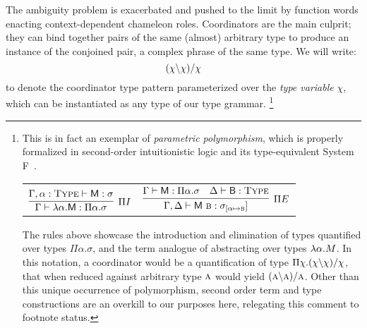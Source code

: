 The ambiguity problem is exacerbated and pushed to the limit by function words enacting context-dependent chameleon roles.
Coordinators are the main culprit; they can bind together pairs of the same (almost) arbitrary type to produce an instance of the conjoined pair, a complex phrase of the same type.
We will write:
\begin{equation}\label{equation:polymorphic_nl_crd}
(\chi\backslash\chi)/\chi
\end{equation}
to denote the coordinator type pattern parameterized over the \textit{type variable} $\chi$, which can be instantiated as any type of our type grammar.%
\footnote{
This is in fact an exemplar of \textit{parametric polymorphism}, which is properly formalized in second-order intuitionistic logic and its type-equivalent System F~\cite{girard1972interpretation, reynolds1974towards}. 
\begin{center}
\begin{tabularx}{0.6\textwidth}{@{}cc@{}}
$\infer[\Pi I]{\Gamma \vdash \lam \alpha.\term{M}: \Pi \alpha.\sigma}{\Gamma, \alpha : \type \vdash \term{M}: \sigma}$
&
$\infer[\Pi E]{\Gamma, \Delta \vdash \term{M~\prop{b}}: \sigma_{[\alpha\mapsto\smallprop{b}}]}{\Gamma \vdash\term{M}: \Pi \alpha.\sigma &  \Delta \vdash \term{B}: \type}$
\end{tabularx}
\end{center}
The rules above showcase the introduction and elimination of types quantified over types $\Pi \alpha.\sigma$, and the term analogue of abstracting over types $\mathnormal{\lambda} \alpha.M$.
In this notation, a coordinator would be a quantification of type $\Pi\chi.(\chi\backslash\chi)/\chi$, that when reduced against arbitrary type $\normalfont\textsc{a}$ would yield $(\normalfont\textsc{a}\backslash\normalfont\textsc{a})/\normalfont\textsc{a}$.
Other than this unique occurrence of polymorphism, second order term and type constructions are an overkill to our purposes here, relegating this comment to footnote status.
}

